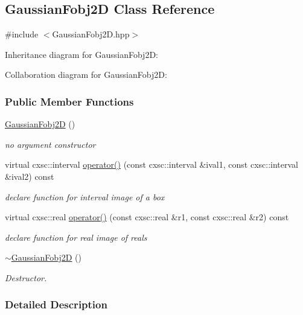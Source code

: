 \hypertarget{classGaussianFobj2D}{\subsection{\-Gaussian\-Fobj2\-D \-Class \-Reference}
\label{classGaussianFobj2D}
}


{\ttfamily \#include $<$\-Gaussian\-Fobj2\-D.\-hpp$>$}



\-Inheritance diagram for \-Gaussian\-Fobj2\-D\-:


\-Collaboration diagram for \-Gaussian\-Fobj2\-D\-:
\subsubsection*{\-Public \-Member \-Functions}
\begin{DoxyCompactItemize}
\item 
\hyperlink{classGaussianFobj2D_ae19d197be260773b4d96bd80c06a0acc}{\-Gaussian\-Fobj2\-D} ()
\begin{DoxyCompactList}\small\item\em no argument constructor \end{DoxyCompactList}\item 
virtual cxsc\-::interval \hyperlink{classGaussianFobj2D_abbdd449d3595b132842ef822a88eb07d}{operator()} (const cxsc\-::interval \&ival1, const cxsc\-::interval \&ival2) const 
\begin{DoxyCompactList}\small\item\em declare function for interval image of a box \end{DoxyCompactList}\item 
virtual cxsc\-::real \hyperlink{classGaussianFobj2D_a623ad551e1738a1f0ce3bac575c3b281}{operator()} (const cxsc\-::real \&r1, const cxsc\-::real \&r2) const 
\begin{DoxyCompactList}\small\item\em declare function for real image of reals \end{DoxyCompactList}\item 
\hyperlink{classGaussianFobj2D_a1ba171ee405c81d0f531e215ec2d9d95}{$\sim$\-Gaussian\-Fobj2\-D} ()
\begin{DoxyCompactList}\small\item\em \-Destructor. \end{DoxyCompactList}\end{DoxyCompactItemize}


\subsubsection{\-Detailed \-Description}


